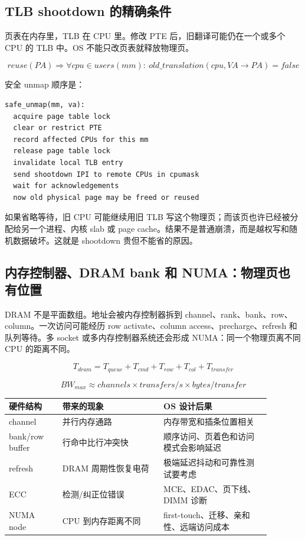 \subsection{TLB shootdown 的精确条件}

页表在内存里，TLB 在 CPU 里。修改 PTE 后，旧翻译可能仍在一个或多个 CPU 的 TLB 中。OS 不能只改页表就释放物理页。

\[
reuse(PA)
\Rightarrow
\forall cpu\in users(mm):\ old\_translation(cpu,VA\rightarrow PA)=false
\]

安全 unmap 顺序是：

\begin{lstlisting}
safe_unmap(mm, va):
  acquire page table lock
  clear or restrict PTE
  record affected CPUs for this mm
  release page table lock
  invalidate local TLB entry
  send shootdown IPI to remote CPUs in cpumask
  wait for acknowledgements
  now old physical page may be freed or reused
\end{lstlisting}

如果省略等待，旧 CPU 可能继续用旧 TLB 写这个物理页；而该页也许已经被分配给另一个进程、内核 slab 或 page cache。结果不是普通崩溃，而是越权写和随机数据破坏。这就是 shootdown 贵但不能省的原因。

\subsection{内存控制器、DRAM bank 和 NUMA：物理页也有位置}

DRAM 不是平面数组。地址会被内存控制器拆到 channel、rank、bank、row、column。一次访问可能经历 row activate、column access、precharge、refresh 和队列等待。多 socket 或多内存控制器系统还会形成 NUMA：同一个物理页离不同 CPU 的距离不同。

\[
T_{dram}=T_{queue}+T_{cmd}+T_{row}+T_{col}+T_{transfer}
\]

\[
BW_{max}\approx channels \times transfers/s \times bytes/transfer
\]

\begin{longtable}{p{0.18\linewidth}p{0.34\linewidth}p{0.36\linewidth}}
\toprule
硬件结构 & 带来的现象 & OS 设计后果 \\
\midrule
channel & 并行内存通路 & 内存带宽和插条位置相关 \\
bank/row buffer & 行命中比行冲突快 & 顺序访问、页着色和访问模式会影响延迟 \\
refresh & DRAM 周期性恢复电荷 & 极端延迟抖动和可靠性测试要考虑 \\
ECC & 检测/纠正位错误 & MCE、EDAC、页下线、DIMM 诊断 \\
NUMA node & CPU 到内存距离不同 & first-touch、迁移、亲和性、远端访问成本 \\
\bottomrule
\end{longtable}

